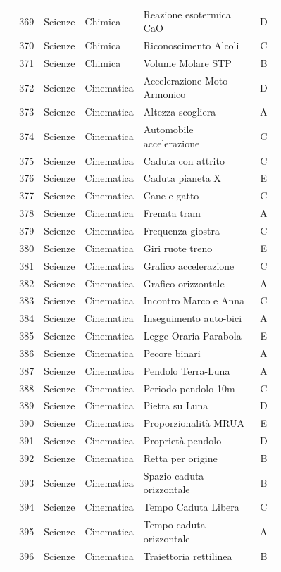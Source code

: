 \documentclass[20pt, a4paper]{article}
\begin{document}
\begin{longtable}{@{}r>{\raggedright\arraybackslash}p{0.14\linewidth}>{\raggedright\arraybackslash}p{0.20\linewidth}>{\raggedright\arraybackslash}p{0.42\linewidth}c@{}}
369 & Scienze & Chimica & Reazione esotermica CaO & D \\
370 & Scienze & Chimica & Riconoscimento Alcoli & C \\
371 & Scienze & Chimica & Volume Molare STP & B \\
372 & Scienze & Cinematica & Accelerazione Moto Armonico & D \\
373 & Scienze & Cinematica & Altezza scogliera & A \\
374 & Scienze & Cinematica & Automobile accelerazione & C \\
375 & Scienze & Cinematica & Caduta con attrito & C \\
376 & Scienze & Cinematica & Caduta pianeta X & E \\
377 & Scienze & Cinematica & Cane e gatto & C \\
378 & Scienze & Cinematica & Frenata tram & A \\
379 & Scienze & Cinematica & Frequenza giostra & C \\
380 & Scienze & Cinematica & Giri ruote treno & E \\
381 & Scienze & Cinematica & Grafico accelerazione & C \\
382 & Scienze & Cinematica & Grafico orizzontale & A \\
383 & Scienze & Cinematica & Incontro Marco e Anna & C \\
384 & Scienze & Cinematica & Inseguimento auto-bici & A \\
385 & Scienze & Cinematica & Legge Oraria Parabola & E \\
386 & Scienze & Cinematica & Pecore binari & A \\
387 & Scienze & Cinematica & Pendolo Terra-Luna & A \\
388 & Scienze & Cinematica & Periodo pendolo 10m & C \\
389 & Scienze & Cinematica & Pietra su Luna & D \\
390 & Scienze & Cinematica & Proporzionalità MRUA & E \\
391 & Scienze & Cinematica & Proprietà pendolo & D \\
392 & Scienze & Cinematica & Retta per origine & B \\
393 & Scienze & Cinematica & Spazio caduta orizzontale & B \\
394 & Scienze & Cinematica & Tempo Caduta Libera & C \\
395 & Scienze & Cinematica & Tempo caduta orizzontale & A \\
396 & Scienze & Cinematica & Traiettoria rettilinea & B \\

\end{longtable}
\end{document}
